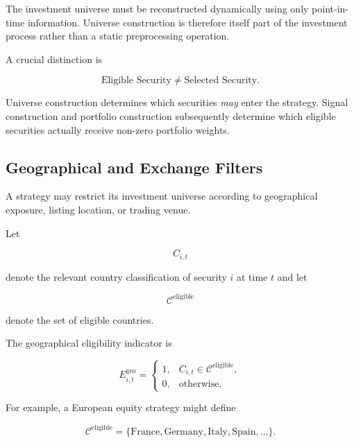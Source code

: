 \documentclass[11pt,a4paper]{article}
\begin{document}
The investment universe must be reconstructed dynamically using only
point-in-time information. Universe construction is therefore itself part of
the investment process rather than a static preprocessing operation.

A crucial distinction is

\begin{equation}
\boxed{
\text{Eligible Security}
\neq
\text{Selected Security}.
}
\end{equation}

Universe construction determines which securities \emph{may} enter the
strategy. Signal construction and portfolio construction subsequently determine
which eligible securities actually receive non-zero portfolio weights.


\subsection{Geographical and Exchange Filters}
\label{subsec:geographical_exchange_filters}

A strategy may restrict its investment universe according to geographical
exposure, listing location, or trading venue.

Let

\begin{equation}
C_{i,t}
\end{equation}

denote the relevant country classification of security $i$ at time $t$ and let

\begin{equation}
\mathcal{C}^{\mathrm{eligible}}
\end{equation}

denote the set of eligible countries.

The geographical eligibility indicator is

\begin{equation}
E_{i,t}^{\mathrm{geo}}
=
\begin{cases}
1,
&
C_{i,t}\in\mathcal{C}^{\mathrm{eligible}},
\\
0,
&
\text{otherwise}.
\end{cases}
\end{equation}

For example, a European equity strategy might define

\begin{equation}
\mathcal{C}^{\mathrm{eligible}}
=
\{
\text{France},
\text{Germany},
\text{Italy},
\text{Spain},
\ldots
\}.
\end{equation}
\end{document}
